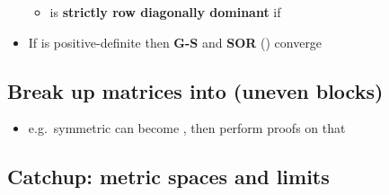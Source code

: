 \begin{itemize}
        \begin{itemize}

          \item
                 is \textbf{strictly row diagonally dominant} if
        \end{itemize}
  \item
        If  is positive-definite then \textbf{G-S} and \textbf{SOR}
        () converge
\end{itemize}

\subsection*{Break up matrices into (uneven
  blocks)}

\begin{itemize}

  \item
        e.g.~symmetric  can become
        ,
        then perform proofs on that
\end{itemize}

\subsection*{Catchup: metric spaces and
  limits}

